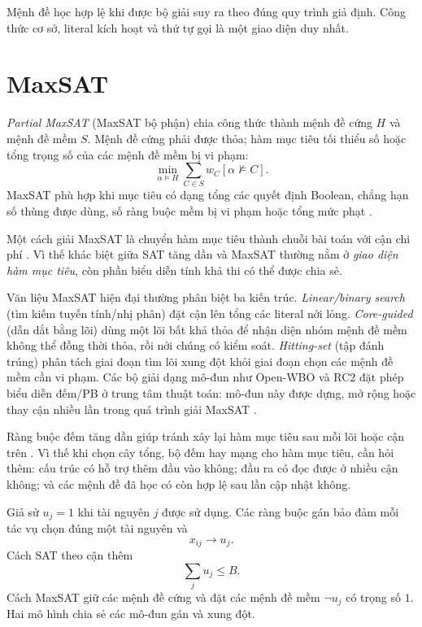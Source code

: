 Mệnh đề học hợp lệ khi được bộ giải suy ra theo đúng quy trình giả định.
Công thức cơ sở, literal kích hoạt và thứ tự gọi là
một giao diện duy nhất.

\section{MaxSAT}

\emph{Partial MaxSAT} (MaxSAT bộ phận) chia công thức thành mệnh đề cứng \(H\) và
mệnh đề mềm \(S\). Mệnh đề cứng phải được thỏa; hàm mục tiêu tối thiểu số hoặc
tổng trọng số của các mệnh đề mềm bị vi phạm:
\[
  \min_{\alpha\models H}
  \sum_{C\in S}w_C[\alpha\not\models C].
\]
MaxSAT phù hợp khi mục tiêu có dạng tổng các quyết định Boolean, chẳng hạn số
thùng được dùng, số ràng buộc mềm bị vi phạm hoặc tổng mức phạt
\parencite{li2009maxsat,ansotegui2013maxsat}.

Một cách giải MaxSAT là chuyển hàm mục tiêu thành chuỗi bài toán \SAT với cận chi phí
\parencite{davies2011maxsat}. Vì thế khác biệt giữa SAT tăng dần và MaxSAT
thường nằm ở \emph{giao diện hàm mục tiêu}, còn phần biểu diễn tính khả thi có
thể được chia sẻ.

Văn liệu MaxSAT hiện đại thường phân biệt ba kiến trúc. \emph{Linear/binary
search} (tìm kiếm tuyến tính/nhị phân) đặt cận lên tổng các literal nới lỏng.
\emph{Core-guided} (dẫn dắt bằng lõi) dùng một lõi bất khả thỏa để nhận diện
nhóm mệnh đề mềm không thể đồng thời thỏa, rồi nới chúng có kiểm soát.
\emph{Hitting-set} (tập đánh trúng) phân tách giai đoạn tìm lõi xung đột khỏi giai đoạn chọn các
mệnh đề mềm cần vi phạm.
Các bộ giải dạng mô-đun như Open-WBO và RC2 đặt phép biểu diễn đếm/PB ở trung tâm
thuật toán: mô-đun này được dựng,
mở rộng hoặc thay cận nhiều lần trong quá trình giải MaxSAT
\parencite{martins2014openwbo,ignatiev2019rc2}.

Ràng buộc đếm tăng dần giúp tránh xây lại hàm mục tiêu sau mỗi lõi hoặc cận
trên \parencite{martins2014incremental}. Vì thế khi chọn cây tổng, bộ đếm hay
mạng cho hàm mục tiêu, cần hỏi thêm: cấu trúc có hỗ trợ thêm đầu vào không; đầu
ra có đọc được ở nhiều cận không; và các mệnh đề đã học
có còn hợp lệ sau lần cập nhật không.

\begin{example}
Giả sử \(u_j=1\) khi tài nguyên \(j\) được sử dụng. Các ràng buộc gán bảo đảm mỗi tác
vụ chọn đúng một tài nguyên và
\[
  x_{ij}\rightarrow u_j.
\]
Cách SAT theo cận thêm
\[
  \sum_ju_j\le B.
\]
Cách MaxSAT giữ các mệnh đề cứng và đặt các mệnh đề mềm \(\neg u_j\) có trọng số
\(1\). Hai mô hình chia sẻ các mô-đun gán và xung đột.
\end{example}

